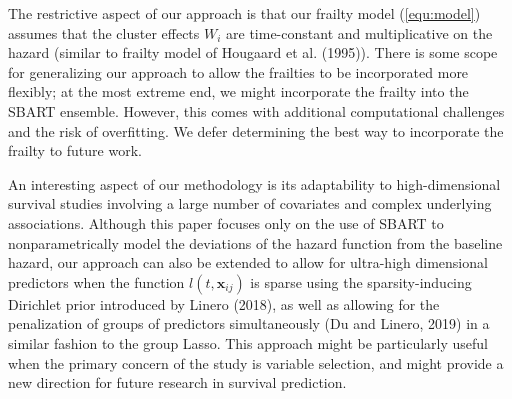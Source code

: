 \documentclass[11pt]{article}
\begin{document}
\color{red}

The restrictive aspect of our approach is that our frailty model (\ref{equ:model}) assumes that the cluster effects $W_i$ are time-constant and multiplicative on the hazard (similar to frailty model of  Hougaard et al. (1995)). There is some scope for generalizing our approach to allow the frailties to be incorporated more flexibly; at the most extreme end, we might incorporate the frailty into the SBART ensemble. 
However, this comes with additional computational challenges and  the risk of overfitting. We defer determining the best way to incorporate the frailty to future work.

\normalcolor

An interesting aspect of our methodology is its adaptability to high-dimensional survival studies involving a large number of covariates and complex underlying associations. Although this paper focuses only on the use of SBART to nonparametrically model the deviations of the hazard function from the baseline hazard, our approach can also be extended to allow for ultra-high dimensional predictors when the function $l(t, \mathbf x_{ij})$ is sparse using the sparsity-inducing Dirichlet prior introduced by Linero (2018), as well as allowing for the penalization of groups of predictors simultaneously (Du and Linero, 2019) in a similar fashion to the group Lasso. This approach might be particularly useful when the primary concern of the study is variable selection, and might provide a new direction for future research in survival prediction.

\end{document}
